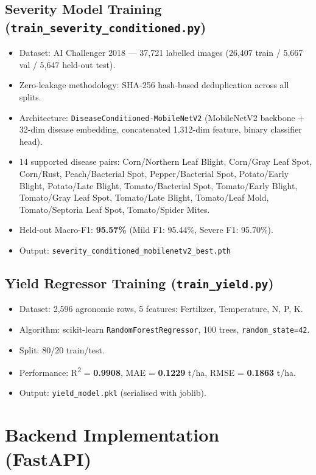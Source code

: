\subsection{Severity Model Training (\texttt{train\_severity\_conditioned.py})}

\begin{itemize}
    \item Dataset: AI Challenger 2018 --- 37,721 labelled images (26,407 train / 5,667 val / 5,647 held-out test).
    \item Zero-leakage methodology: SHA-256 hash-based deduplication across all splits.
    \item Architecture: \texttt{DiseaseConditioned-}\allowbreak\texttt{MobileNetV2} (MobileNetV2 backbone + 32-dim disease embedding, concatenated 1,312-dim feature, binary classifier head).
    \item 14 supported disease pairs: Corn/Northern Leaf Blight, Corn/Gray Leaf Spot, Corn/Rust, Peach/Bacterial Spot, Pepper/Bacterial Spot, Potato/Early Blight, Potato/Late Blight, Tomato/Bacterial Spot, Tomato/Early Blight, Tomato/Gray Leaf Spot, Tomato/Late Blight, Tomato/Leaf Mold, Tomato/Septoria Leaf Spot, Tomato/Spider Mites.
    \item Held-out Macro-F1: \textbf{95.57\%} (Mild F1: 95.44\%, Severe F1: 95.70\%).
    \item Output: \texttt{severity\_conditioned\_mobilenetv2\_best.pth}
\end{itemize}

\subsection{Yield Regressor Training (\texttt{train\_yield.py})}

\begin{itemize}
    \item Dataset: 2,596 agronomic rows, 5 features: Fertilizer, Temperature, N, P, K.
    \item Algorithm: scikit-learn \texttt{RandomForestRegressor}, 100 trees, \texttt{random\_state=42}.
    \item Split: 80/20 train/test.
    \item Performance: R\textsuperscript{2} = \textbf{0.9908}, MAE = \textbf{0.1229} t/ha, RMSE = \textbf{0.1863} t/ha.
    \item Output: \texttt{yield\_model.pkl} (serialised with joblib).
\end{itemize}

\section{Backend Implementation (FastAPI)}

